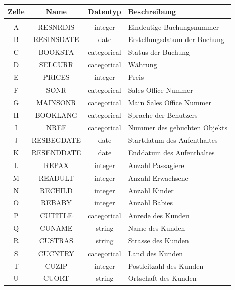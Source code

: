 \begin{longtable}{ | c | c | c | L{7.5cm} | } 
	\hline 
	\bfseries Zelle & \bfseries Name & \bfseries Datentyp & \bfseries Beschreibung \\ \hline 
	
	 \\ \hline
	A & RESNRDIS & integer & Eindeutige Buchungsnummer \\ \hline 
	B & RESINSDATE & date & Erstellungsdatum der Buchung \\ \hline 
	C & BOOKSTA & categorical & Status der Buchung \\ \hline 
	D & SELCURR & categorical & Währung \\ \hline 
	E & PRICES & integer & Preis \\ \hline 
	F & SONR & categorical & Sales Office Nummer \\ \hline 
	G & MAINSONR & categorical & Main Sales Office Nummer \\ \hline 
	H & BOOKLANG & categorical & Sprache der Benutzers \\ \hline 
	I & NREF & categorical & Nummer des gebuchten Objekts \\ \hline 
	J & RESBEGDATE & date & Startdatum des Aufenthaltes \\ \hline 
	K & RESENDDATE & date & Enddatum des Aufenthaltes \\ \hline 
	L & REPAX & integer & Anzahl Passagiere \\ \hline 
	M & READULT & integer & Anzahl Erwachsene \\ \hline 
	N & RECHILD & integer & Anzahl Kinder \\ \hline 
	O & REBABY & integer & Anzahl Babies \\ \hline 
	P & CUTITLE & categorical & Anrede des Kunden \\ \hline 
	Q & CUNAME & string & Name des Kunden \\ \hline 
	R & CUSTRAS & string & Strasse des Kunden \\ \hline 
	S & CUCNTRY & categorical & Land des Kunden \\ \hline 
	T & CUZIP & integer & Postleitzahl des Kunden \\ \hline 
	U & CUORT & string & Ortschaft des Kunden \\ \hline 
	

\end{longtable}
